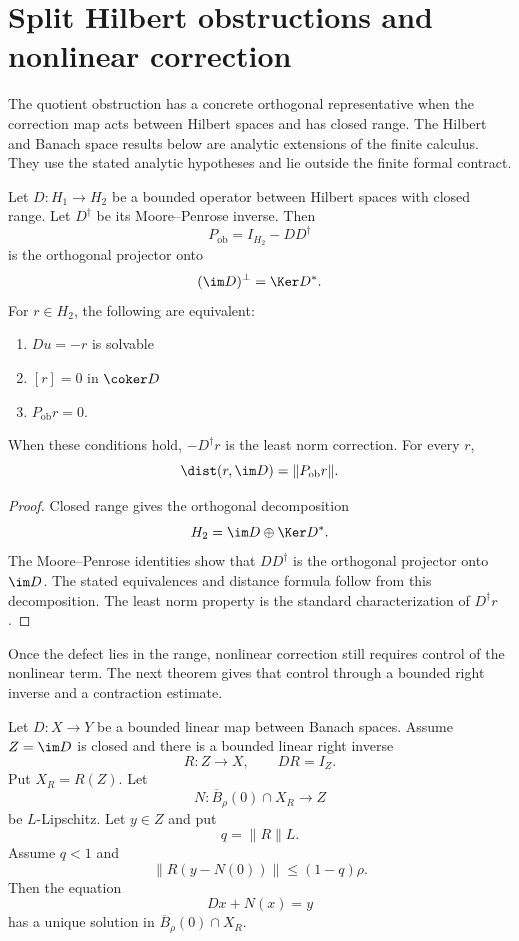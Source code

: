 \section{Split Hilbert obstructions and nonlinear correction}\label{sec:split_obstruction}

The quotient obstruction has a concrete orthogonal representative when the correction map acts between Hilbert spaces and has closed range. The Hilbert and Banach space results below are analytic extensions of the finite calculus. They use the stated analytic hypotheses and lie outside the finite formal contract.

\begin{theorem}\label{thm:orthogonal_obstruction}
Let $D:H_1\to H_2$ be a bounded operator between Hilbert spaces with closed range.  Let $D^\dagger$ be its Moore--Penrose inverse.  Then
\[
P_{\mathrm{ob}}=I_{H_2}-DD^\dagger
\]
is the orthogonal projector onto
\[
(\im D)^\perp=\Ker D^*.
\]
For $r\in H_2$, the following are equivalent:
\begin{enumerate}
\item $Du=-r$ is solvable
\item $[r]=0$ in $\coker D$
\item $P_{\mathrm{ob}}r=0$.
\end{enumerate}
When these conditions hold, $-D^\dagger r$ is the least norm correction.  For every $r$,
\[
\dist(r,\im D)=\|P_{\mathrm{ob}}r\|.
\]
\end{theorem}

\begin{proof}
Closed range gives the orthogonal decomposition
\[
H_2=\im D\oplus\Ker D^*.
\]
The Moore--Penrose identities show that $DD^\dagger$ is the orthogonal projector onto $\im D$.  The stated equivalences and distance formula follow from this decomposition.  The least norm property is the standard characterization of $D^\dagger r$.
\end{proof}

Once the defect lies in the range, nonlinear correction still requires control of the nonlinear term. The next theorem gives that control through a bounded right inverse and a contraction estimate.

\begin{theorem}\label{thm:right_inverse_correction}
Let $D:X\to Y$ be a bounded linear map between Banach spaces.  Assume $Z=\im D$ is closed and there is a bounded linear right inverse
\[
R:Z\longrightarrow X,
\qquad
DR=I_Z.
\]
Put $X_R=R(Z)$.  Let
\[
N:\overline B_\rho(0)\cap X_R\longrightarrow Z
\]
be $L$-Lipschitz.  Let $y\in Z$ and put
\[
q=\|R\|L.
\]
Assume $q<1$ and
\[
\|R(y-N(0))\|
\le
(1-q)\rho.
\]
Then the equation
\[
Dx+N(x)=y
\]
has a unique solution in $\overline B_\rho(0)\cap X_R$.
\end{theorem}

